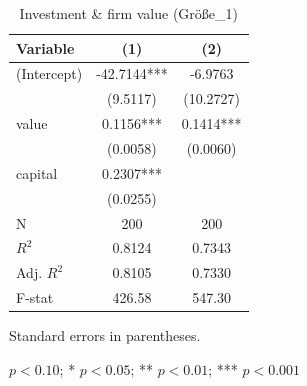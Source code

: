 \begin{table}[htbp]
\centering
\begin{threeparttable}
\caption{Investment \& firm value (Größe\_1)}
\label{tab:grunfeld}
\begin{tabular}{lcc}
\hline\hline
Variable & (1) & (2) \\
\hline
(Intercept) & -42.7144*** & -6.9763 \\
  & (9.5117) & (10.2727) \\
value & 0.1156*** & 0.1414*** \\
  & (0.0058) & (0.0060) \\
capital & 0.2307*** &  \\
  & (0.0255) &  \\
\hline
N & 200 & 200 \\
$R^2$ & 0.8124 & 0.7343 \\
Adj. $R^2$ & 0.8105 & 0.7330 \\
F-stat & 426.58 & 547.30 \\
\hline\hline
\end{tabular}
\begin{tablenotes}\footnotesize
\item Standard errors in parentheses.
\item \textdagger{} $p<0.10$; * $p<0.05$; ** $p<0.01$; *** $p<0.001$
\end{tablenotes}
\end{threeparttable}
\end{table}
